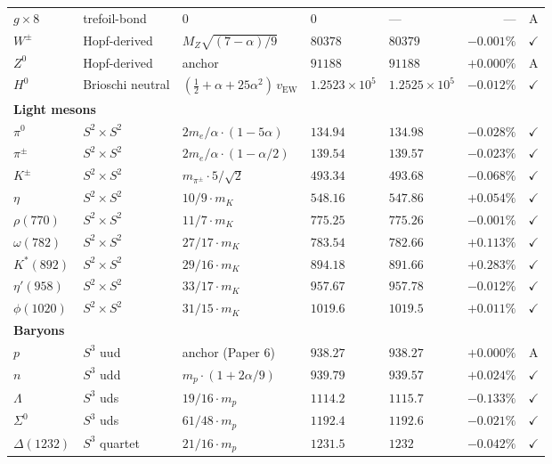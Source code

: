 \documentclass[11pt]{article}
\begin{document}
{\begin{longtable}{@{}p{1.2cm}p{2.4cm}p{4.8cm}p{1.6cm}p{1.4cm}rc@{}}
$g\times 8$ & trefoil-bond & $0$ & $0$ & --- & --- & A \\
$W^\pm$ & Hopf-derived & $M_Z\sqrt{(7{-}\alpha)/9}$ & $80378$ & $80379$ & $-0.001\%$ & $\checkmark$ \\
$Z^0$ & Hopf-derived & anchor & $91188$ & $91188$ & $+0.000\%$ & A \\
$H^0$ & Brioschi neutral & $(\tfrac{1}{2}{+}\alpha{+}25\alpha^2)\,v_\text{EW}$ & $1.2523{\times}10^5$ & $1.2525{\times}10^5$ & $-0.012\%$ & $\checkmark$ \\
\multicolumn{7}{l}{\textbf{Light mesons}} \\
$\pi^0$ & $S^2\times S^2$ & $2m_e/\alpha\cdot(1{-}5\alpha)$ & $134.94$ & $134.98$ & $-0.028\%$ & $\checkmark$ \\
$\pi^\pm$ & $S^2\times S^2$ & $2m_e/\alpha\cdot(1{-}\alpha/2)$ & $139.54$ & $139.57$ & $-0.023\%$ & $\checkmark$ \\
$K^\pm$ & $S^2\times S^2$ & $m_{\pi^\pm}\cdot 5/\sqrt{2}$ & $493.34$ & $493.68$ & $-0.068\%$ & $\checkmark$ \\
$\eta$ & $S^2\times S^2$ & $10/9\cdot m_K$ & $548.16$ & $547.86$ & $+0.054\%$ & $\checkmark$ \\
$\rho(770)$ & $S^2\times S^2$ & $11/7\cdot m_K$ & $775.25$ & $775.26$ & $-0.001\%$ & $\checkmark$ \\
$\omega(782)$ & $S^2\times S^2$ & $27/17\cdot m_K$ & $783.54$ & $782.66$ & $+0.113\%$ & $\checkmark$ \\
$K^*(892)$ & $S^2\times S^2$ & $29/16\cdot m_K$ & $894.18$ & $891.66$ & $+0.283\%$ & $\checkmark$ \\
$\eta'(958)$ & $S^2\times S^2$ & $33/17\cdot m_K$ & $957.67$ & $957.78$ & $-0.012\%$ & $\checkmark$ \\
$\phi(1020)$ & $S^2\times S^2$ & $31/15\cdot m_K$ & $1019.6$ & $1019.5$ & $+0.011\%$ & $\checkmark$ \\
\multicolumn{7}{l}{\textbf{Baryons}} \\
$p$ & $S^3$ uud & anchor (Paper 6) & $938.27$ & $938.27$ & $+0.000\%$ & A \\
$n$ & $S^3$ udd & $m_p\cdot(1{+}2\alpha/9)$ & $939.79$ & $939.57$ & $+0.024\%$ & $\checkmark$ \\
$\Lambda$ & $S^3$ uds & $19/16\cdot m_p$ & $1114.2$ & $1115.7$ & $-0.133\%$ & $\checkmark$ \\
$\Sigma^0$ & $S^3$ uds & $61/48\cdot m_p$ & $1192.4$ & $1192.6$ & $-0.021\%$ & $\checkmark$ \\
$\Delta(1232)$ & $S^3$ quartet & $21/16\cdot m_p$ & $1231.5$ & $1232$ & $-0.042\%$ & $\checkmark$ \\

\end{longtable}}
\end{document}
